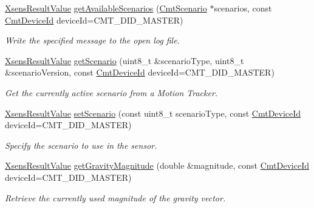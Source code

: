 \begin{DoxyCompactItemize}
\item 
\hyperlink{group__enums_ga822a2260a20af524029eef9e9a51ff6f}{\-Xsens\-Result\-Value} \hyperlink{classxsens_1_1Cmt3_a8b1290bf95cdedea935a9cfa3de5a50b}{get\-Available\-Scenarios} (\hyperlink{structCmtScenario}{\-Cmt\-Scenario} $\ast$scenarios, const \hyperlink{cmtdef_8h_a2e3b6a17360828d440ee848959918af2}{\-Cmt\-Device\-Id} device\-Id=\-C\-M\-T\-\_\-\-D\-I\-D\-\_\-\-M\-A\-S\-T\-E\-R)
\begin{DoxyCompactList}\small\item\em \-Write the specified message to the open log file. \end{DoxyCompactList}\item 
\hyperlink{group__enums_ga822a2260a20af524029eef9e9a51ff6f}{\-Xsens\-Result\-Value} \hyperlink{classxsens_1_1Cmt3_a8fd5ef38158eec6e372ccd7110a0d35a}{get\-Scenario} (uint8\-\_\-t \&scenario\-Type, uint8\-\_\-t \&scenario\-Version, const \hyperlink{cmtdef_8h_a2e3b6a17360828d440ee848959918af2}{\-Cmt\-Device\-Id} device\-Id=\-C\-M\-T\-\_\-\-D\-I\-D\-\_\-\-M\-A\-S\-T\-E\-R)
\begin{DoxyCompactList}\small\item\em \-Get the currently active scenario from a \-Motion \-Tracker. \end{DoxyCompactList}\item 
\hyperlink{group__enums_ga822a2260a20af524029eef9e9a51ff6f}{\-Xsens\-Result\-Value} \hyperlink{classxsens_1_1Cmt3_acdd8011c15d3086e47ddfba6cd046347}{set\-Scenario} (const uint8\-\_\-t scenario\-Type, const \hyperlink{cmtdef_8h_a2e3b6a17360828d440ee848959918af2}{\-Cmt\-Device\-Id} device\-Id=\-C\-M\-T\-\_\-\-D\-I\-D\-\_\-\-M\-A\-S\-T\-E\-R)
\begin{DoxyCompactList}\small\item\em \-Specify the scenario to use in the sensor. \end{DoxyCompactList}\item 
\hyperlink{group__enums_ga822a2260a20af524029eef9e9a51ff6f}{\-Xsens\-Result\-Value} \hyperlink{classxsens_1_1Cmt3_a87f15c0a1a15c505abda16cd3c3fcc48}{get\-Gravity\-Magnitude} (double \&magnitude, const \hyperlink{cmtdef_8h_a2e3b6a17360828d440ee848959918af2}{\-Cmt\-Device\-Id} device\-Id=\-C\-M\-T\-\_\-\-D\-I\-D\-\_\-\-M\-A\-S\-T\-E\-R)
\begin{DoxyCompactList}\small\item\em \-Retrieve the currently used magnitude of the gravity vector. \end{DoxyCompactList}\item 

\end{DoxyCompactItemize}
